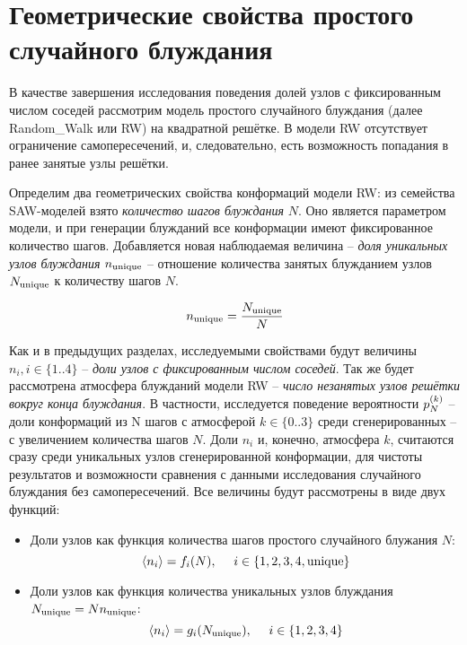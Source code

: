 \section{Геометрические свойства простого случайного блуждания}

В качестве завершения исследования поведения долей узлов с фиксированным числом соседей рассмотрим модель простого случайного блуждания (далее Random\_Walk или RW) на квадратной решётке. 
В модели RW отсутствует ограничение самопересечений, и, следовательно, есть возможность попадания в ранее занятые узлы решётки.

Определим два геометрических свойства конформаций модели RW: из семейства SAW-моделей взято \textit{количество шагов блуждания} $N$. 
Оно является параметром модели, и при генерации блужданий все конформации имеют фиксированное количество шагов.
Добавляется новая наблюдаемая величина -- \textit{доля уникальных узлов блуждания} $n_{\textup{unique}}$ -- отношение количества занятых блужданием узлов $N_{\textup{unique}}$ к количеству шагов $N$.

\begin{equation}
n_{\textup{unique}} = \frac{N_{\textup{unique}}}{N}
\label{eq:nun}
\end{equation}

Как и в предыдущих разделах, исследуемыми свойствами будут величины $n_i, i \in \{1..4\}$ -- \textit{доли узлов с фиксированным числом соседей}. 
Так же будет рассмотрена атмосфера блужданий модели RW -- \textit{число незанятых узлов решётки вокруг конца блуждания}. 
В частности, исследуется поведение вероятности $p^{(k)}_N$ -- доли конформаций из N шагов с атмосферой $k \in \{0..3\}$ среди сгенерированных -- с увеличением количества шагов $N$.
Доли $n_i$ и, конечно, атмосфера $k$, считаются сразу среди уникальных узлов сгенерированной конформации, для чистоты результатов и возможности сравнения с данными исследования случайного блуждания без самопересечений.
Все величины будут рассмотрены в виде двух функций:

\begin{itemize}
\item Доли узлов как функция количества шагов простого случайного блужания $N$: 
\begin{equation}
 \langle n_i \rangle = f_i(N),\ \ \ \ i \in \{1,2,3,4, \textup{unique}\}
\label{eq:f_i}
\end{equation}
\item Доли узлов как функция количества уникальных узлов блуждания $N_{\textup{unique}} = N n_{\textup{unique}}$:
\begin{equation}
 \langle n_i \rangle = g_i(N_{\textup{unique}}),\ \ \ \ i \in \{1,2,3,4\} 
\label{eq:g_i}
\end{equation}
\end{itemize}

